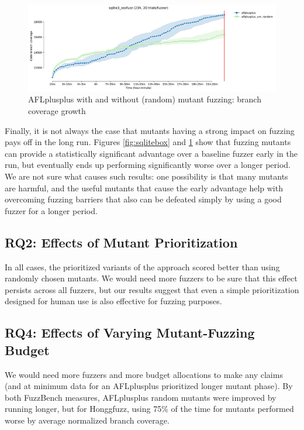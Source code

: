 \begin{figure}
  \includegraphics[width=0.75\columnwidth]{sqlite3_ossfuzz_coverage_growth.pdf}
  \caption{AFLplusplus with and without (random) mutant fuzzing: branch coverage growth}
  \label{fig:sqlitegrowth}  
\end{figure}

Finally, it is not always the case that mutants having a strong impact on fuzzing pays off in the long run.  Figures \ref{fig:sqlitebox} and \ref{fig:sqlitegrowth} show that fuzzing mutants can provide a statistically significant advantage over a baseline fuzzer early in the run, but eventually ends up performing significantly worse over a longer period.  We are not sure what causes such results: one possibility is that many mutants are harmful, and the useful mutants that cause the early advantage help with overcoming fuzzing barriers that also can be defeated simply by using a good fuzzer for a longer period.

 \subsection{RQ2: Effects of Mutant Prioritization}

In all cases, the prioritized variants of the approach scored better than using randomly chosen mutants.  We would need more fuzzers to be sure that this effect persists across all fuzzers, but our results suggest that even a simple prioritization designed for human use is also effective for fuzzing purposes.

\subsection{RQ4: Effects of Varying Mutant-Fuzzing Budget}

We would need more fuzzers and more budget allocations to make any claims (and at minimum data for an AFLplusplus prioritized longer mutant phase).  By both FuzzBench measures, AFLplusplus random mutants were improved by running longer, but for Honggfuzz, using 75\% of the time for mutants performed worse by average normalized branch coverage.
    
